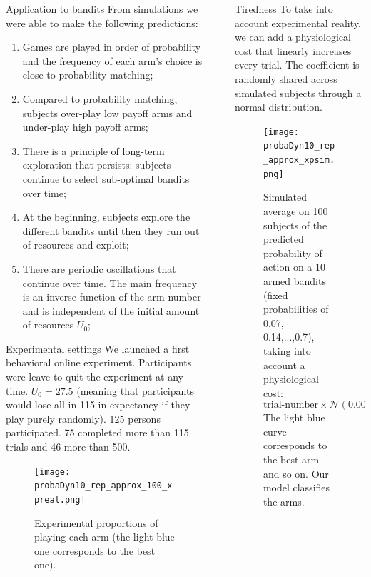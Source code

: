 \documentclass[final]{beamer}
\newlength{\sepwidth}
\newlength{\colwidth}
\newcommand{\separatorcolumn}{\begin{column}{\sepwidth}\end{column}}
\begin{document}
\begin{frame}[t]
\begin{columns}[t]
\begin{column}{\colwidth}
\begin{block}{Application to bandits}
 From simulations we were able to make the following predictions:
 
 \begin{enumerate}
\item Games are played in order of probability and the frequency of each arm's choice is close to probability matching;
\item Compared to probability matching, subjects over-play low payoff arms and under-play high payoff arms;
\item There is a principle of long-term exploration that persists: subjects continue to select sub-optimal bandits over time;
\item At the beginning, subjects explore the different bandits until then they run out of resources and exploit; %
\item There are periodic oscillations that continue over time. The main frequency is an inverse function of the arm number and is independent of the initial amount of resources $U_0$;
\end{enumerate}
  \end{block}
  
\begin{block}{Experimental settings}
We launched a first behavioral online experiment. Participants were leave to quit the experiment at any time. $U_0 = 27.5$ (meaning that participants would lose all in 115 in expectancy if they play purely randomly). 125 persons participated. 75 completed more than 115 trials and 46 more than 500.
 \begin{figure}
      \centering
      \texttt{[image: probaDyn10\_rep\_approx\_100\_xpreal.png]} 
      \caption{Experimental proportions of playing each arm (the light blue one corresponds to the best one).}
    \end{figure}
\end{block}
  
  \end{column}
\separatorcolumn
\begin{column}{\colwidth}
 \begin{alertblock}{Tiredness}
 To take into account experimental reality, we can add a physiological cost that linearly increases every trial. The coefficient is randomly shared across simulated subjects through a normal distribution.
 
    \begin{figure}
      \centering
      \texttt{[image: probaDyn10\_rep\_approx\_xpsim.png]} 
      \caption{Simulated average on 100 subjects of the predicted probability of action on a 10 armed bandits (fixed probabilities of 0.07, 0.14,...,0.7), taking into account a physiological cost:
$$\text{trial-number} \times \mathcal{N} ( 0.00148, 0.00146).$$
      The  light blue curve corresponds to the best arm and so on. Our model classifies the arms.}
    \end{figure}
 \end{alertblock}
  

\end{column}
\end{columns}
\end{frame}
\end{document}
